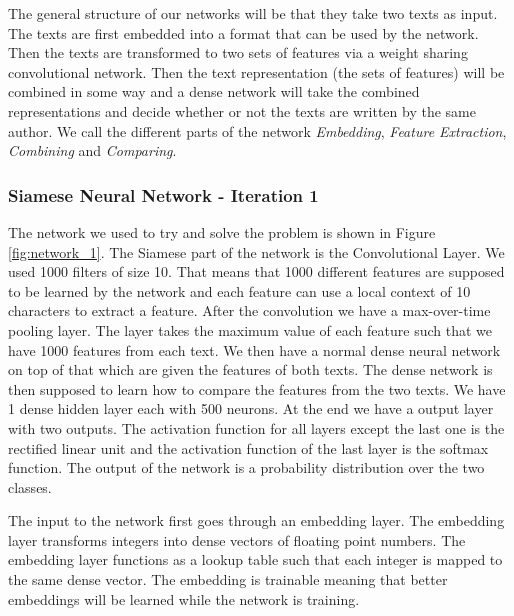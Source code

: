 The general structure of our networks will be that they take two texts as
input. The texts are first embedded into a format that can be used by the
network. Then the texts are transformed to two sets of features via a weight
sharing convolutional network. Then the text representation (the sets of
features) will be combined in some way and a dense network will take the
combined representations and decide whether or not the texts are written by the
same author. We call the different parts of the network \textit{Embedding},
\textit{Feature Extraction}, \textit{Combining} and \textit{Comparing}.


\subsubsection{Siamese Neural Network - Iteration 1}

The network we used to try and solve the problem is shown in Figure
\ref{fig:network_1}. The Siamese part of the network is the Convolutional
Layer. We used 1000 filters of size 10. That means that 1000 different features
are supposed to be learned by the network and each feature can use a local
context of 10 characters to extract a feature. After the convolution we have a
max-over-time pooling layer. The layer takes the maximum value of each feature
such that we have 1000 features from each text. We then have a normal dense
neural network on top of that which are given the features of both texts. The
dense network is then supposed to learn how to compare the features from the two
texts. We have 1 dense hidden layer each with 500 neurons. At the end we have
a output layer with two outputs. The activation function for all layers except
the last one is the rectified linear unit and the activation function of the
last layer is the softmax function. The output of the network is a probability
distribution over the two classes.

The input to the network first goes through an embedding layer. The embedding
layer transforms integers into dense vectors of floating point numbers. The
embedding layer functions as a lookup table such that each integer is mapped
to the same dense vector. The embedding is trainable meaning that better
embeddings will be learned while the network is training.

